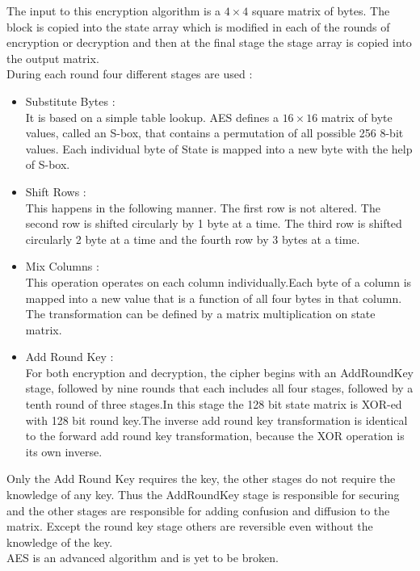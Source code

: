 \documentclass{article}
\begin{document}
The input to this encryption algorithm is a $4\times4$ square matrix of bytes. The block is copied into the state array which is modified in each of the rounds of encryption or decryption and then at the final stage the stage array is copied into the output matrix.\\
During each round four different stages are used :
\begin{itemize}
    \item Substitute Bytes :\\
    It is based on a simple table lookup. AES defines a $16\times16$ matrix of byte values, called an S-box, that contains a permutation of all possible 256 8-bit values. Each individual byte of State is mapped into a new byte with the help of S-box.
    \item Shift Rows : \\
    This happens in the following manner. The first row is not altered. The second row is shifted circularly by 1 byte at a time. The third row is shifted circularly 2 byte at a time and the fourth row by 3 bytes at a time.
    \item Mix Columns : \\
    This operation operates on each column individually.Each byte of a column is mapped into a new value that is a function of all four bytes in that column. The transformation can be defined by a matrix multiplication on state matrix.
    \item Add Round Key :\\
    For both encryption and decryption, the cipher begins with an AddRoundKey stage, followed by nine rounds that each includes all four stages, followed by a tenth round of three stages.In this stage the 128 bit state matrix is XOR-ed with 128 bit round key.The inverse add round key transformation is identical to the forward add round key transformation, because the XOR operation is its own inverse.
\end{itemize}
Only the Add Round Key requires the key, the other stages do not require the knowledge of any key. Thus the AddRoundKey stage is responsible for securing and the other stages are responsible for adding confusion and diffusion to the matrix. Except the round key stage others are reversible even without the knowledge of the key.\\
AES is an advanced algorithm and is yet to be broken.
\end{document}
